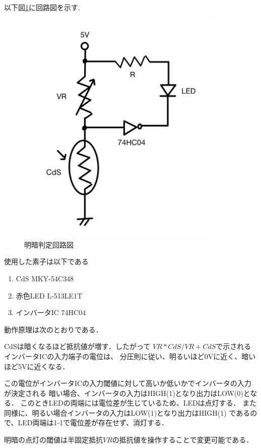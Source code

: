 \documentclass[titlepage]{jarticle}
\begin{document}
以下図\ref{fig:明暗判定回路図}に回路図を示す.
\begin{figure}[H]
    \begin{center}
        \includegraphics[width=10cm]{image/2.jpg}
        \caption{明暗判定回路図}
        \label{fig:明暗判定回路図}
    \end{center}
\end{figure}

使用した素子は以下である
\begin{enumerate}
    \item CdS MKY-54C348
    \item 赤色LED L-513LE1T
    \item インバータIC 74HC04
\end{enumerate}

動作原理は次のとおりである．

CdSは暗くなるほど抵抗値が増す．したがって
$VR*CdS/VR+CdS$で示されるインバータICの入力端子の電位は、
分圧則に従い、明るいほど0Vに近く、暗いほど5Vに近くなる．

この電位がインバータICの入力閾値に対して高いか低いかでインバータの入力が決定される
暗い場合、インバータの入力はHIGH(1)となり出力はLOW(0)となる．
このときLEDの両端には電位差が生じているため、LEDは点灯する．
また同様に、明るい場合インバータの入力はLOW(1)となり出力はHIGH(1)
であるので、LED両端は1-1で電位差が存在せず、消灯する．

明暗の点灯の閾値は半固定抵抗$VR$の抵抗値を操作することで変更可能である．
\end{document}
